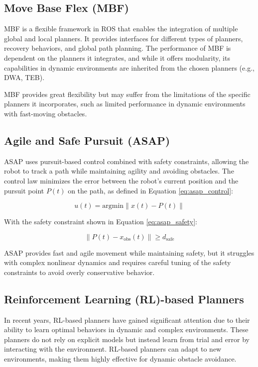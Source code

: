 \documentclass[conference]{IEEEtran}
\begin{document}
\subsection{Move Base Flex (MBF)}
MBF is a flexible framework in ROS that enables the integration of multiple global and local planners. It provides interfaces for different types of planners, recovery behaviors, and global path planning. The performance of MBF is dependent on the planners it integrates, and while it offers modularity, its capabilities in dynamic environments are inherited from the chosen planners (e.g., DWA, TEB).

MBF provides great flexibility but may suffer from the limitations of the specific planners it incorporates, such as limited performance in dynamic environments with fast-moving obstacles.

\subsection{Agile and Safe Pursuit (ASAP)}
ASAP uses pursuit-based control combined with safety constraints, allowing the robot to track a path while maintaining agility and avoiding obstacles. The control law minimizes the error between the robot’s current position and the pursuit point \(P(t)\) on the path, as defined in Equation \eqref{eq:asap_control}:

\begin{equation}
\label{eq:asap_control}
u(t) = \text{argmin} \| x(t) - P(t) \|
\end{equation}

With the safety constraint shown in Equation \eqref{eq:asap_safety}:

\begin{equation}
\label{eq:asap_safety}
\| P(t) - x_{\text{obs}}(t) \| \geq d_{\text{safe}}
\end{equation}

ASAP provides fast and agile movement while maintaining safety, but it struggles with complex nonlinear dynamics and requires careful tuning of the safety constraints to avoid overly conservative behavior.

\subsection{Reinforcement Learning (RL)-based Planners}
In recent years, RL-based planners have gained significant attention due to their ability to learn optimal behaviors in dynamic and complex environments. These planners do not rely on explicit models but instead learn from trial and error by interacting with the environment. RL-based planners can adapt to new environments, making them highly effective for dynamic obstacle avoidance.
\end{document}
